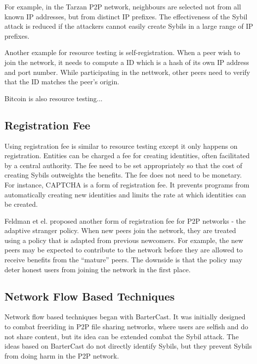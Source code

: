 For example, in the Tarzan P2P network, neighbours are selected not from all
known IP addresses, but from distinct IP prefixes\cite{freedman2002tarzan}. The
effectiveness of the Sybil attack is reduced if the attackers cannot easily
create Sybils in a large range of IP prefixes.

Another example for resource
testing is self-registration\cite{dinger2006defending}. When a peer wish to join
the network, it needs to compute a ID which is a hash of its own IP address and
port number. While participating in the nettwork, other peers need to verify
that the ID matches the peer's origin.

Bitcoin is also resource testing...

\subsection{Registration Fee}
Using registration fee is similar to resource testing except it only happens on
registration. Entities can be charged a fee for creating identities, often 
facilitated by a central authority. The fee need to be set appropriately so that
the cost of creating Sybils outweights the benefits. The fee does not need to be
monetary. For instance, CAPTCHA\cite{von2003captcha} is a form of
registration fee. It prevents programs from automatically creating new
identities and limits the rate at which identities can be created.

Feldman et el. proposed another form of registration fee for P2P networks - the
adaptive stranger policy\cite{feldman2004robust}. When new peers join the
network, they are treated using a policy that is adapted from previous
newcomers. For example, the new peers may be expected to contribute to the
network before they are allowed to receive benefits from the ``mature'' peers.
The downside is that the policy may deter honest users from joining the network
in the first place.


\subsection{Network Flow Based Techniques}
Network flow based techniques began with
BarterCast\cite{meulpolder2009bartercast}. It was initially designed to combat
freeriding in P2P file sharing networks, where users are selfish and do not
share content, but its idea can be extended combat the Sybil attack. The ideas
based on BarterCast do not directly identify Sybils, but they prevent Sybils
from doing harm in the P2P network.

